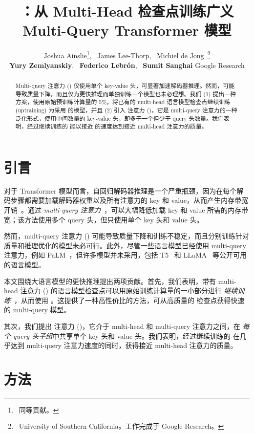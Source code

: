 \documentclass[11pt]{article}
\title{\gmq：从 Multi-Head 检查点训练广义 Multi-Query Transformer 模型}
\author{
Joshua Ainslie\thanks{\- \ 同等贡献。},~ James Lee-Thorp\footnotemark[1],~ Michiel de Jong\footnotemark[1] \ \footnotemark[2]\thanks{\- \ University of Southern California。工作完成于 Google Research。} \\
{\bf Yury Zemlyanskiy},~ {\bf Federico Lebr\'{o}n},~ {\bf Sumit Sanghai}
  \AND
  {\rm \Large Google Research}\\
  }
\begin{document}
\maketitle
\begin{abstract}
Multi-query 注意力 (\mq) 仅使用单个 key-value 头，可显著加速解码器推理。然而，\mq 可能导致质量下降，而且仅为更快推理而单独训练一个模型也未必理想。我们 (1) 提出一种方案，使用原始预训练计算量的 5\%，将已有的 multi-head 语言模型检查点继续训练 (uptraining) 为采用 \mq 的模型，并且 (2) 引入 \fullgmq 注意力 (\gmq)，它是 multi-query 注意力的一种泛化形式，使用中间数量的 key-value 头，即多于一个但少于 query 头数量。我们表明，经过继续训练的 \gmq 能以接近 \mq 的速度达到接近 multi-head 注意力的质量。

\end{abstract}

\section{引言}
\label{section:intro}

对于 Transformer 模型而言，自回归解码器推理是一个严重瓶颈，因为在每个解码步骤都需要加载解码器权重以及所有注意力的 key 和 value，从而产生内存带宽开销~\citep{shazeer2019mq, palminference, dejong2022fido}。通过 \emph{multi-query 注意力}~\citep{shazeer2019mq}，可以大幅降低加载 key 和 value 所需的内存带宽；该方法使用多个 query 头，但只使用单个 key 头和 value 头。

然而，multi-query 注意力 (\mq) 可能导致质量下降和训练不稳定，而且分别训练针对质量和推理优化的模型未必可行。此外，尽管一些语言模型已经使用 multi-query 注意力，例如 PaLM~\citep{palm}，但许多模型并未采用，包括 T5~\citep{t5} 和 LLaMA~\citep{llama} 等公开可用的语言模型。

本文围绕大语言模型的更快推理提出两项贡献。首先，我们表明，带有 multi-head 注意力 (\mh) 的语言模型检查点可以用原始训练计算量的一小部分进行 \emph{继续训练}~\citep{sparsemoe}，从而使用 \mq。这提供了一种高性价比的方法，可从高质量的 \mh 检查点获得快速的 multi-query 模型。

其次，我们提出 \fullgmq 注意力 (\gmq)，它介于 multi-head 和 multi-query 注意力之间，在 \emph{每个 query 头子组}中共享单个 key 头和 value 头。我们表明，经过继续训练的 \gmq 在几乎达到 multi-query 注意力速度的同时，获得接近 multi-head 注意力的质量。

\section{方法}
\label{section:method}
\end{document}
